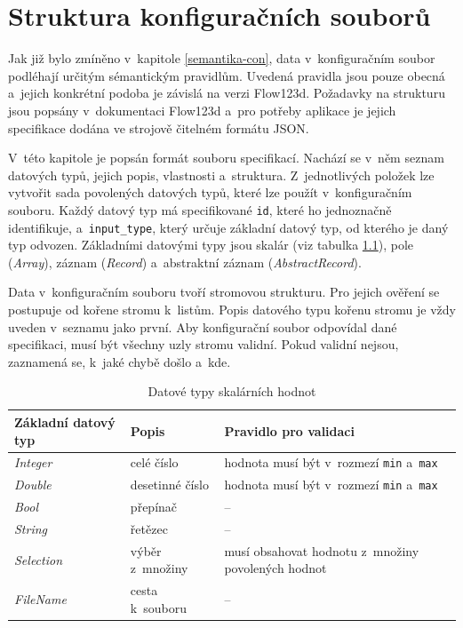\documentclass[FM,MP]{tulthesis}
\begin{document}
\chapter{Struktura konfiguračních souborů}
	\label{struktura-konf-souboru}
	Jak již bylo zmíněno v~kapitole \ref{semantika-con}, data v~konfiguračním soubor podléhají určitým sémantickým pravidlům. Uvedená pravidla jsou pouze obecná a~jejich konkrétní podoba je závislá na verzi Flow123d. Požadavky na strukturu jsou popsány v~dokumentaci Flow123d a~pro potřeby aplikace je jejich specifikace dodána ve strojově čitelném formátu JSON.

	V~této kapitole je popsán formát souboru specifikací. Nachází se v~něm seznam datových typů, jejich popis, vlastnosti a~struktura. Z~jednotlivých položek lze vytvořit sada povolených datových typů, které lze použít v~konfiguračním souboru. Každý datový typ má specifikované \texttt{id}, které ho jednoznačně identifikuje, a~\texttt{input\_type}, který určuje základní datový typ, od kterého je daný typ odvozen. Základními datovými typy jsou skalár (viz tabulka \ref{tab:typy-skalaru}), pole (\textit{Array}), záznam (\textit{Record}) a~abstraktní záznam (\textit{AbstractRecord}).

	Data v~konfiguračním souboru tvoří stromovou strukturu. Pro jejich ověření se postupuje od kořene stromu k~listům. Popis datového typu kořenu stromu je vždy uveden v~seznamu jako první. Aby konfigurační soubor odpovídal dané specifikaci, musí být všechny uzly stromu validní. Pokud validní nejsou, zaznamená se, k~jaké chybě došlo a~kde.

	\begin{table}[h]
		\small
		\centering
		\caption{Datové typy skalárních hodnot}
		\label{tab:typy-skalaru}
		\begin{tabular}{|l|l|l|}
		\hline
		\textbf{Základní datový typ} & \textbf{Popis}           & \textbf{Pravidlo pro validaci}                                            \\
		\hline
		\textit{Integer}    & celé číslo      & hodnota musí být v~rozmezí \texttt{min} a~\texttt{max}               \\
		\textit{Double}     & desetinné číslo & hodnota musí být v~rozmezí \texttt{min} a~\texttt{max}               \\
		\textit{Bool}       & přepínač        & --                                                  \\
		\textit{String}     & řetězec         & --                                                  \\
		\textit{Selection}  & výběr z~množiny & \parbox[t]{7cm}{musí obsahovat hodnotu z~množiny povolených hodnot} \\
		\textit{FileName}   & cesta k~souboru & --                                                  \\
		\hline
		\end{tabular}
	\end{table}
	\normalsize
\end{document}
